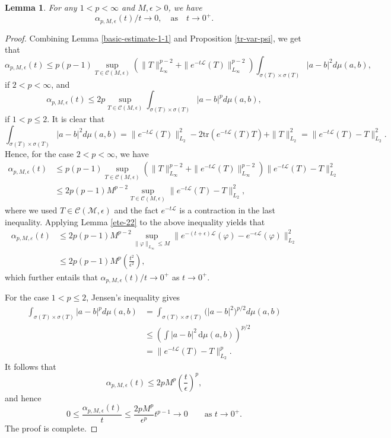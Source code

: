 \documentclass{amsbook}
\newtheorem{lemma}[theorem]{Lemma}
\theoremstyle{definition}
\theoremstyle{remark}
\numberwithin{section}{chapter}
\numberwithin{equation}{chapter}
\newcommand{\1}{\mathbf{1}}
\begin{document}
\begin{lemma}\label{alpha-0}
For any \(1<p <\infty\) and \(M, \epsilon > 0\), we have
\[
\alpha_{p, M, \epsilon}(t)/t \to 0,\quad \mbox{as}\quad t \to 0^{+}.
\]
\end{lemma}
\begin{proof}
Combining Lemma \ref{basic-estimate-1-1} and Proposition \ref{tr-var-psi}, we get that
\[
\alpha_{p,M,\epsilon}(t)\leq
p(p-1)\sup_{T\in \mathcal{C}(M,\epsilon)}\left(\|T\|^{p-2}_{L_{\infty}}+\|e^{-t\mathcal{L}}(T)\|^{p-2}_{L_{\infty}}\right)\int_{\sigma(T)\times \sigma(T)}|a-b|^{2}d\mu(a,b),
\]
if $2<p<\infty$, and
\[
\alpha_{p,M,\epsilon}(t)\leq 2p\sup_{T\in \mathcal{C}(M,\epsilon)}\int_{\sigma(T)\times \sigma(T)}|a-b|^{p}d\mu(a,b),
\]
if $1<p\leq 2$. It is clear that
\[
\int_{\sigma(T)\times \sigma(T)}|a-b|^{2}d\mu(a,b)=\|e^{-t\mathcal{L}}(T)\|^{2}_{L_{2}}-2\mathrm{tr}\left(e^{-t\mathcal{L}}(T)T\right)+\|T\|^{2}_{L_{2}}=\|e^{-t\mathcal{L}}(T)-T\|^{2}_{L_{2}}.
\]
Hence, for the case $2<p<\infty$, we have
\begin{align*}
\alpha_{p,M,\epsilon}(t)&\leq p(p-1)\sup_{T\in \mathcal{C}(M,\epsilon)}(\|T\|^{p-2}_{L_{\infty}}+\|e^{-t\mathcal{L}}(T)\|^{p-2}_{L_{\infty}})\|e^{-t\mathcal{L}}(T)-T\|^{2}_{L_{2}}\\
&\leq 2p(p-1)M^{p-2}\sup_{T\in \mathcal{C}(M,\epsilon)}\|e^{-t\mathcal{L}}(T)-T\|^{2}_{L_{2}},
\end{align*}
where we used $T\in \mathcal{C(M,\epsilon)}$ and the fact $e^{-t\mathcal{L}}$ is a contraction in the last inequality.  Applying Lemma \ref{ete-22} to the above inequality yields that
\begin{align*}
	\alpha_{p,M,\varepsilon}(t)&\leq 2p(p-1)M^{p-2}\sup_{\|\varphi\|_{L_{\infty}}\leq M}\|e^{-(t+\epsilon)\mathcal{L}}(\varphi)-e^{-\epsilon\mathcal{L}}(\varphi)\|^{2}_{L_{2}}\\
	&\leq 2p(p-1)M^{p}\left(\frac{t^{2}}{\epsilon^{2}}\right),
\end{align*}
which further entails that $\alpha_{p,M,\epsilon}(t)/t\to 0^{+}$ as $t\to 0^{+}$.

For the case $1<p\leq 2$,  Jensen's inequality gives
\begin{align*}
\int_{\sigma(T)\times \sigma(T)}|a-b|^{p}d\mu(a,b)&=\int_{\sigma(T)\times \sigma(T)}\big(|a-b|^{2}\big)^{p/2}d\mu(a,b)\\
&\leq\left(\int |a-b|^2\,\mathrm d\mu(a,b)
\right)^{p/2}\\
&= \|e^{-t\mathcal{L}}(T)-T\|_{L_{2}}^p.
\end{align*}
It follows that
\[
\alpha_{p,M,\epsilon}(t)
\leq
2pM^p\left(\frac{t}{\epsilon}\right)^p,
\]
and hence
\[
0\leq
\frac{\alpha_{p,M,\epsilon}(t)}{t}
\leq
\frac{2pM^p}{\epsilon^p}t^{p-1}
\longrightarrow0
\qquad\text{as }t\to0^+.
\]
The proof is complete.
\end{proof}
\end{document}
